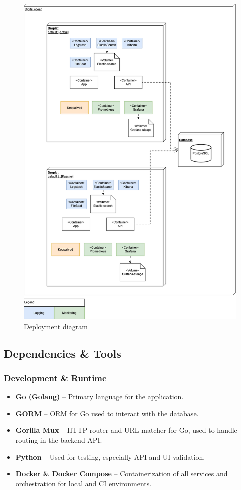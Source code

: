 \begin{figure}[!htb]
    \centering
    \includegraphics[width=0.5\linewidth]{Images/Deployment.png}
    \caption{Deployment diagram}
    \label{fig:Deployment}
\end{figure}


\subsection{Dependencies \& Tools}

\subsubsection*{Development \& Runtime}
\begin{itemize}
  \item \textbf{Go (Golang)} – Primary language for the application.
  \item \textbf{GORM} – ORM for Go used to interact with the database.
  \item \textbf{Gorilla Mux} – HTTP router and URL matcher for Go, used to handle routing in the backend API.
  \item \textbf{Python} – Used for testing, especially API and UI validation.
  \item \textbf{Docker \& Docker Compose} – Containerization of all services and orchestration for local and CI environments.
\end{itemize}

